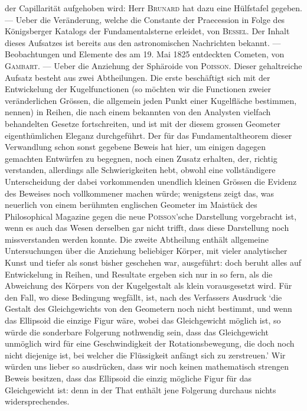 der Capillarität aufgehoben wird: Herr \textsc{Brunard} hat dazu eine Hülfstafel gegeben. — Ueber die Veränderung, welche die Constante der  Praecession in Folge des Königsberger Katalogs der Fundamentalsterne erleidet, von \textsc{Bessel}. Der Inhalt dieses Aufsatzes ist bereits aus den astronomischen Nachrichten bekannt. --- Beobachtungen und Elemente des am 19. Mai 1825 entdeckten Cometen, von \textsc{Gambart}. --- Ueber die Anziehung der Sphäroide von \textsc{Poisson}. Dieser gehaltreiche Aufsatz besteht aus zwei Abtheilungen. Die erste beschäftigt sich mit der Entwickelung der Kugelfunctionen (so möchten wir die Functionen zweier veränderlichen Grössen, die allgemein jeden Punkt einer Kugelfläche bestimmen, nennen) in Reihen, die nach einem bekannten von den Analysten vielfach behandelten Gesetze fortschreiten, und ist mit der diesem grossen Geometer eigenthümlichen Eleganz durchgeführt. Der für das Fundamentaltheorem dieser Verwandlung schon sonst gegebene Beweis hat hier, um einigen dagegen gemachten Entwürfen zu begegnen, noch einen Zusatz erhalten, der, richtig verstanden, allerdings alle Schwierigkeiten hebt, obwohl eine vollständigere Unterscheidung der dabei vorkommenden unendlich kleinen Grössen die Evidenz des Beweises noch vollkommener machen würde; wenigstens zeigt das, was neuerlich von einem berühmten englischen Geometer im Maistück des Philosophical Magazine gegen die neue \textsc{Poisson}'sche Darstellung vorgebracht ist, wenn es auch das Wesen derselben gar nicht trifft, dass diese Darstellung noch missverstanden werden konnte. Die zweite Abtheilung enthält allgemeine Untersuchungen über die Anziehung beliebiger Körper, mit vieler analytischer Kunst und tiefer als sonst bisher geschehen war, ausgeführt: doch beruht alles auf Entwickelung in Reihen, und Resultate ergeben sich nur in so fern, als die Abweichung des Körpers von der Kugelgestalt als klein vorausgesetzt wird. Für den Fall, wo diese Bedingung wegfällt, ist, nach des Verfassers Ausdruck ‘die Gestalt des Gleichgewichts von den Geometern noch nicht bestimmt, und wenn das Ellipsoid die einzige Figur wäre, wobei das Gleichgewicht möglich ist, so würde die sonderbare Folgerung nothwendig sein, dass das Gleichgewicht unmöglich wird für eine Geschwindigkeit der Rotationsbewegung, die doch noch nicht diejenige ist, bei welcher die Flüssigkeit anfängt sich zu zerstreuen.’ Wir würden uns lieber so ausdrücken, dass wir noch keinen mathematisch strengen Beweis besitzen, dass das Ellipsoid die einzig mögliche Figur für das Gleichgewicht ist: denn in der That enthält jene Folgerung durchaus nichts widersprechendes.
